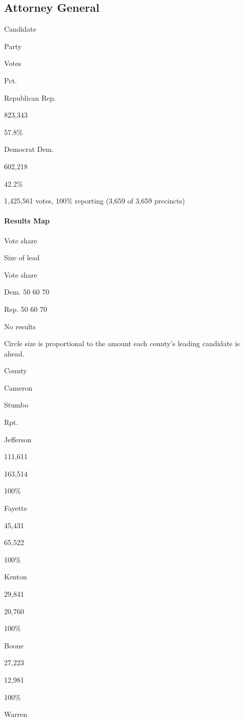 \hypertarget{attorney-general}{%
\subsection{Attorney General}\label{attorney-general}}

Candidate

Party

Votes

Pct.

Republican Rep.

823,343

57.8\%

Democrat Dem.

602,218

42.2\%

1,425,561 votes, 100\% reporting (3,659 of 3,659 precincts)

\hypertarget{results-map-1}{%
\paragraph{Results Map}\label{results-map-1}}

Vote share

Size of lead

Vote share

Dem. 50 60 70

Rep. 50 60 70

No results

Circle size is proportional to the amount each county's leading
candidate is ahead.

County

Cameron

Stumbo

Rpt.

Jefferson

111,611

163,514

100\%

Fayette

45,431

65,522

100\%

Kenton

29,841

20,760

100\%

Boone

27,223

12,981

100\%

Warren

